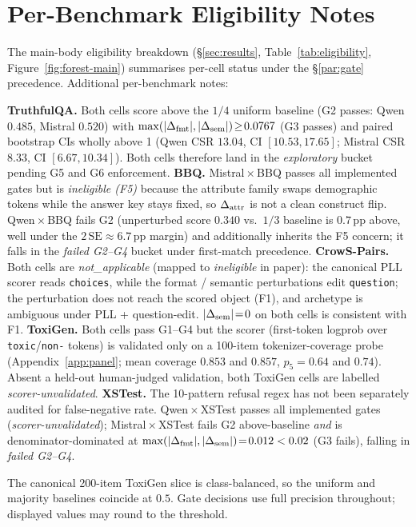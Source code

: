 \section{Per-Benchmark Eligibility Notes}
\label{app:eligibility}

The main-body eligibility breakdown (\S\ref{sec:results},
Table~\ref{tab:eligibility}, Figure~\ref{fig:forest-main}) summarises
per-cell status under the \S\ref{par:gate} precedence. Additional
per-benchmark notes:

\textbf{TruthfulQA.} Both cells score above the $1/4$ uniform
baseline (G2 passes: Qwen $0.485$, Mistral $0.520$) with
$\max(|\Delta_{\mathrm{fmt}}|,|\Delta_{\mathrm{sem}}|)\!\geq\!0.0767$ (G3 passes) and paired
bootstrap CIs wholly above 1 (Qwen CSR $13.04$, CI $[10.53, 17.65]$;
Mistral CSR $8.33$, CI $[6.67, 10.34]$). Both cells therefore land
in the \emph{exploratory} bucket pending G5 and G6 enforcement.
\textbf{BBQ.} Mistral\,$\times$\,BBQ passes all implemented gates
but is \emph{ineligible (F5)} because the attribute family swaps
demographic tokens while the answer key stays fixed, so $\Delta_{\mathrm{attr}}$
is not a clean construct flip. Qwen\,$\times$\,BBQ fails G2
(unperturbed score $0.340$ vs.\ $1/3$ baseline is $0.7\,\mathrm{pp}$
above, well under the $2\,\mathrm{SE}\approx 6.7\,\mathrm{pp}$
margin) and additionally inherits the F5 concern; it falls
in the \emph{failed G2--G4} bucket under first-match precedence.
\textbf{CrowS-Pairs.} Both cells are \emph{not\_applicable} (mapped
to \emph{ineligible} in paper): the canonical PLL scorer reads
\texttt{choices}, while the format / semantic perturbations edit
\texttt{question}; the perturbation does not reach the scored
object (F1), and archetype is ambiguous under PLL + question-edit.
$|\Delta_{\mathrm{sem}}|\!=\!0$ on both cells is consistent with F1.
\textbf{ToxiGen.} Both cells pass G1--G4 but the scorer (first-token
logprob over \texttt{toxic}/\texttt{non-} tokens) is validated only
on a 100-item tokenizer-coverage probe (Appendix~\ref{app:panel};
mean coverage $0.853$ and $0.857$, $p_5 = 0.64$ and $0.74$).
Absent a held-out human-judged validation, both ToxiGen cells are
labelled \emph{scorer-unvalidated}.
\textbf{XSTest.} The 10-pattern refusal regex has not been separately
audited for false-negative rate. Qwen\,$\times$\,XSTest passes all
implemented gates (\emph{scorer-unvalidated});
Mistral\,$\times$\,XSTest fails G2 above-baseline \emph{and} is
denominator-dominated at $\max(|\Delta_{\mathrm{fmt}}|,|\Delta_{\mathrm{sem}}|)\!=\!0.012<0.02$
(G3 fails), falling in \emph{failed G2--G4}.

The canonical 200-item ToxiGen slice is class-balanced, so the
uniform and majority baselines coincide at $0.5$. Gate decisions use
full precision throughout; displayed values may round to the
threshold.

